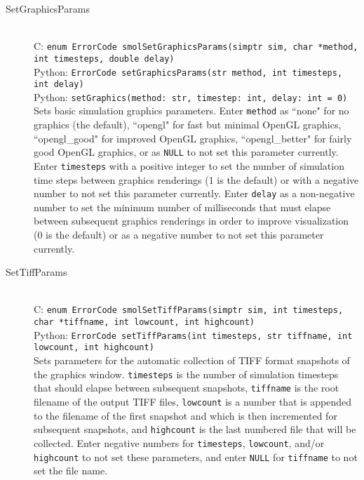\documentclass {book}
\newcommand {\ttt} {\texttt}
\begin{document}
\begin{description}

\item[SetGraphicsParams]
\hfill \\
C: \ttt{enum ErrorCode smolSetGraphicsParams(simptr sim, char *method, int timesteps, double delay)}\\
Python: \ttt{ErrorCode setGraphicsParams(str method, int timesteps, int delay)}\\
Python: \ttt{setGraphics(method: str, timestep: int, delay: int = 0)}\\
Sets basic simulation graphics parameters. Enter \ttt{method} as ``none" for no graphics (the default), ``opengl" for fast but minimal OpenGL graphics, ``opengl\_good" for improved OpenGL graphics, ``opengl\_better" for fairly good OpenGL graphics, or as \ttt{NULL} to not set this parameter currently. Enter \ttt{timesteps} with a positive integer to set the number of simulation time steps between graphics renderings (1 is the default) or with a negative number to not set this parameter currently. Enter \ttt{delay} as a non-negative number to set the minimum number of milliseconds that must elapse between subsequent graphics renderings in order to improve visualization (0 is the default) or as a negative number to not set this parameter currently.

\item[SetTiffParams]
\hfill \\
C: \ttt{enum ErrorCode smolSetTiffParams(simptr sim, int timesteps, char *tiffname, int lowcount, int highcount)}\\
Python: \ttt{ErrorCode setTiffParams(int timesteps, str tiffname, int lowcount, int highcount)}\\
Sets parameters for the automatic collection of TIFF format snapshots of the graphics window. \ttt{timesteps} is the number of simulation timesteps that should elapse between subsequent snapshots, \ttt{tiffname} is the root filename of the output TIFF files, \ttt{lowcount} is a number that is appended to the filename of the first snapshot and which is then incremented for subsequent snapshots, and \ttt{highcount} is the last numbered file that will be collected. Enter negative numbers for \ttt{timesteps}, \ttt{lowcount}, and/or \ttt{highcount} to not set these parameters, and enter \ttt{NULL} for \ttt{tiffname} to not set the file name.


\end{description}
\end{document}
